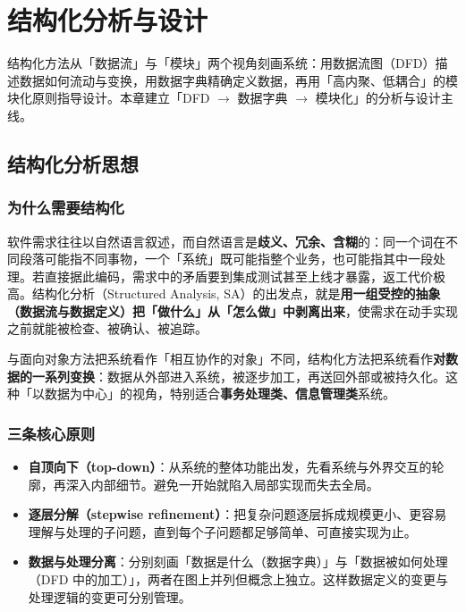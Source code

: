 \clearpage
\begingroup
\let\clearpage\relax
\let\cleardoublepage\relax
\vspace*{\fill}
\chapter{结构化分析与设计}
\begin{center}
结构化方法从「数据流」与「模块」两个视角刻画系统：用数据流图（DFD）描述数据如何流动与变换，用数据字典精确定义数据，再用「高内聚、低耦合」的模块化原则指导设计。本章建立「DFD $\to$ 数据字典 $\to$ 模块化」的分析与设计主线。
\end{center}
\vspace*{\fill}
\endgroup
\clearpage

\section{结构化分析思想}

\subsection{为什么需要结构化}

软件需求往往以自然语言叙述，而自然语言是\textbf{歧义、冗余、含糊}的：同一个词在不同段落可能指不同事物，一个「系统」既可能指整个业务，也可能指其中一段处理。若直接据此编码，需求中的矛盾要到集成测试甚至上线才暴露，返工代价极高。结构化分析（Structured Analysis, SA）的出发点，就是\textbf{用一组受控的抽象（数据流与数据定义）把「做什么」从「怎么做」中剥离出来}，使需求在动手实现之前就能被检查、被确认、被追踪。

与面向对象方法把系统看作「相互协作的对象」不同，结构化方法把系统看作\textbf{对数据的一系列变换}：数据从外部进入系统，被逐步加工，再送回外部或被持久化。这种「以数据为中心」的视角，特别适合\textbf{事务处理类、信息管理类}系统。

\subsection{三条核心原则}

\begin{itemize}
    \item \textbf{自顶向下（top-down）}：从系统的整体功能出发，先看系统与外界交互的轮廓，再深入内部细节。避免一开始就陷入局部实现而失去全局。
    \item \textbf{逐层分解（stepwise refinement）}：把复杂问题逐层拆成规模更小、更容易理解与处理的子问题，直到每个子问题都足够简单、可直接实现为止。
    \item \textbf{数据与处理分离}：分别刻画「数据是什么（数据字典）」与「数据被如何处理（DFD 中的加工）」，两者在图上并列但概念上独立。这样数据定义的变更与处理逻辑的变更可分别管理。
\end{itemize}

